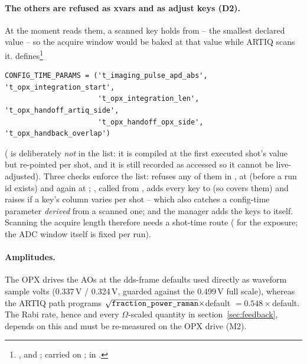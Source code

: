 \paragraph{The others are refused as xvars and as adjust keys (D2).} At the
moment  reads them, a scanned key holds
 from  -- the smallest declared value --
so the acquire window would be baked at that value while ARTIQ scans it.
 defines\footnote{,
 and ;
carried on ;
 in .}
\begin{lstlisting}[style=py]
CONFIG_TIME_PARAMS = ('t_imaging_pulse_apd_abs', 't_opx_integration_start',
                      't_opx_integration_len', 't_opx_handoff_artiq_side',
                      't_opx_handoff_opx_side', 't_opx_handback_overlap')
\end{lstlisting}
( is deliberately \emph{not} in the list:
it is compiled at the first executed shot's value but re-pointed per shot,
and it is still recorded as accessed so it cannot be live-adjusted). Three
checks enforce the list:  refuses any of them
in , at  (before a run id exists) and again
at ; ,
called from , adds every key to 
(so  covers them) and raises if a key's
column varies per shot -- which also catches a config-time parameter
\emph{derived} from a scanned one; and the manager adds the keys to
 itself. Scanning the acquire length therefore needs a
shot-time route ( for the exposure; the ADC
window itself is fixed per run).

\paragraph{Amplitudes.} The OPX drives the AOs at the dds-frame defaults used
directly as waveform sample volts (0.337\,V / 0.324\,V, guarded against the
0.499\,V full scale), whereas the ARTIQ path programs
$\sqrt{\texttt{fraction\_power\_raman}}\times$default $= 0.548\times$default. The
Rabi rate, hence  and every $\Omega$-scaled quantity
in section~\ref{sec:feedback}, depends on this and must be re-measured on the
OPX drive (M2).

